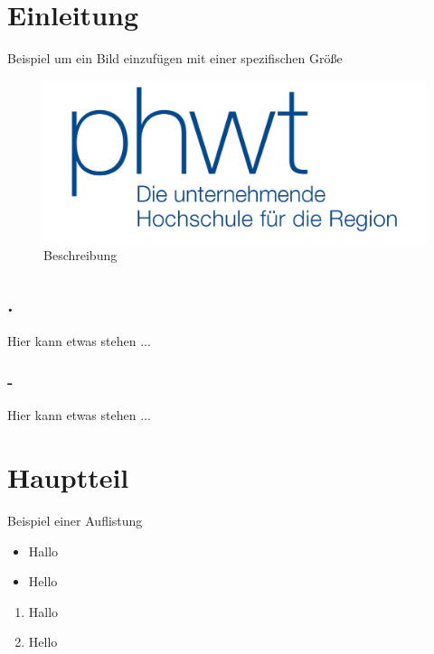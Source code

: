 \documentclass[a4paper, 12pt]{article}
\begin{document}

\setcounter{page}{1}
\newcommand{\groesse}{13cm}

\section{Einleitung}
Beispiel um ein Bild einzufügen mit einer spezifischen Größe

\begin{figure}[!ht]
    \centering
    \includegraphics[width=\groesse]{images/PHWTLogo.jpg}
    \caption{Beschreibung}
    \label{fig:referenz}
\end{figure}
\FloatBarrier

\subsection{.}
Hier kann etwas stehen ... \par
\nocite{Abadi.2016} %
\cite{Abadi.2016}  %

\subsubsection{-}
Hier kann etwas stehen ... \par
{}

\newpage
\section{Hauptteil}
Beispiel einer Auflistung

\begin{itemize}
    \item Hallo
    \item Hello
\end{itemize}

\begin{enumerate}[noitemsep]
\centering
    \item Hallo
    \item Hello
\end{enumerate}
\end{document}
